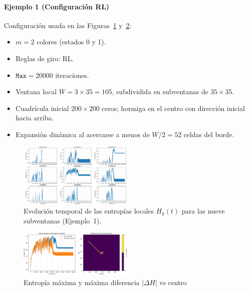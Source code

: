 \documentclass[twocolumn]{article}
\begin{document}
\paragraph{Ejemplo 1 (Configuración RL)}
Configuración usada en las Figuras~\ref{fig:entropias_locales} y~\ref{fig:max_vs_diff}:
\begin{itemize}
  \item \(m=2\) colores (estados 0 y 1). 
  \item Reglas de giro: RL.  
  \item \(\texttt{Max}=20000\) iteraciones.  
  \item Ventana local \(W=3\times35=105\), subdividida en subventanas de \(35\times35\).  
  \item Cuadrícula inicial \(200\times200\) ceros; hormiga en el centro con dirección inicial hacia arriba.  
  \item Expansión dinámica al acercarse a menos de \(W/2=52\) celdas del borde.
\end{itemize}

\begin{figure}[H]
  \centering
  \includegraphics[width=0.5\textwidth]{fig_entropias_locales.png}
  \caption{Evolución temporal de las entropías locales \(H_k(t)\) para las nueve subventanas (Ejemplo 1).}
  \label{fig:entropias_locales}
\end{figure}

 
\begin{figure}[H]
  \centering
  \includegraphics[width=0.5\textwidth]{fig_max_vs_diff.png}
  \caption{Entropía máxima y máxima diferencia \(|\Delta H|\) vs centro}
  \label{fig:max_vs_diff}
\end{figure}
\end{document}
